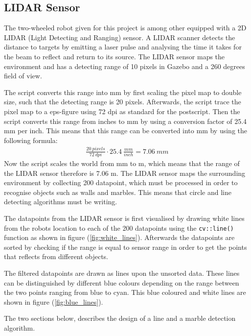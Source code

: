 \documentclass[../Head/Main.tex]{subfiles}
\begin{document}
\subsection{LIDAR Sensor}
The two-wheeled robot given for this project is among other equipped with a 2D LIDAR (Light Detecting and Ranging) sensor. A LIDAR scanner detects the distance to targets by emitting a laser pulse and analysing the time it takes for the beam to reflect and return to its source. The LIDAR sensor maps the environment and has a detecting range of 10 pixels in Gazebo and a 260 degrees field of view. \par
The script converts this range into mm by first scaling the pixel map to double size, such that the detecting range is 20 pixels. Afterwards, the script trace the pixel map to a eps-figure using 72 dpi as standard for the postscript. Then the script converts this range from inches to mm by using a conversion factor of 25.4 mm per inch. This means that this range can be converted into mm by using the following formula:
\begin{align*}
\frac{20~pixels}{72~dpi}\cdot 25.4~\frac{mm}{inch} = 7.06~mm
\end{align*}
Now the script scales the world from mm to m, which means that the range of the LIDAR sensor therefore is 7.06 m.
The LIDAR sensor maps the surrounding environment by collecting 200 datapoint, which must be processed in order to recognise objects such as walls and marbles. This means that circle and line detecting algorithms must be writing.

\clearpage
The datapoints from the LIDAR sensor is first visualised by drawing white lines from the robots location to each of the 200 datapoints using the \texttt{cv::line()} function as shown in figure (\ref{fig:white_lines}). Afterwards the datapoints are sorted by checking if the range is equal to sensor range in order to get the points that reflects from different objects.\par

The filtered datapoints are drawn as lines upon the unsorted data. These lines can be distinguished by different blue colours depending on the range between the two points ranging from blue to cyan. This blue coloured and white lines are shown in figure (\ref{fig:blue_lines}).

The two sections below, describes the design of a line and a marble detection algorithm.


\end{document}
